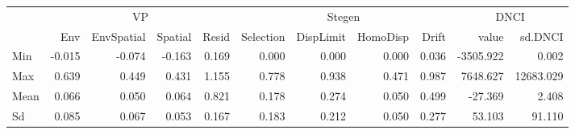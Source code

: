 \begin{longtable}{l|rrrrrrrrrr}
\toprule
\multicolumn{1}{l}{} & \multicolumn{4}{c}{VP} & \multicolumn{4}{c}{Stegen} & \multicolumn{2}{c}{DNCI} \\ 
\cmidrule(lr){2-5} \cmidrule(lr){6-9} \cmidrule(lr){10-11}
\multicolumn{1}{l}{} & Env & EnvSpatial & Spatial & Resid & Selection & DispLimit & HomoDisp & Drift & value & sd.DNCI \\ 
\midrule
Min & -0.015 & -0.074 & -0.163 & 0.169 & 0.000 & 0.000 & 0.000 & 0.036 & -3505.922 & 0.002 \\ 
Max & 0.639 & 0.449 & 0.431 & 1.155 & 0.778 & 0.938 & 0.471 & 0.987 & 7648.627 & 12683.029 \\ 
Mean & 0.066 & 0.050 & 0.064 & 0.821 & 0.178 & 0.274 & 0.050 & 0.499 & -27.369 & 2.408 \\ 
Sd & 0.085 & 0.067 & 0.053 & 0.167 & 0.183 & 0.212 & 0.050 & 0.277 & 53.103 & 91.110 \\ 
\bottomrule
\end{longtable}


